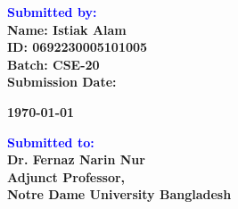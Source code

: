 \documentclass[12pt]{article}
\begin{document}
\begin{titlepage}
\begin{center}
    \vspace{1em}
    \begin{flushleft}
        \textbf{\Huge \textcolor{blue}{Submitted by:}} \\
        \vspace{0.3cm}
        \textbf{\Large Name: Istiak Alam} \\
        \vspace{0.3cm}
        \textbf{\Large ID: 0692230005101005} \\
		\vspace{0.3cm}        
        \textbf{\Large Batch: CSE-20} \\
        \vspace{0.5cm}
        \textbf{\Large Submission Date: }{\Large \textbf{\today}\par}
    \end{flushleft}
    \vfill
    \begin{flushleft}
        \textbf{\Huge \textcolor{blue}{Submitted to:}} \\
        \vspace{0.3cm}
        \textbf{\Large Dr. Fernaz Narin Nur} \\
        \vspace{0.3cm}
        \textbf{\Large Adjunct Professor,} \\
        \vspace{0.3cm}
        \textbf{\Large Notre Dame University Bangladesh}
    \end{flushleft}
\end{center}
\end{titlepage}						%

\tableofcontents
\thispagestyle{empty}
\clearpage
{}
\end{document}
